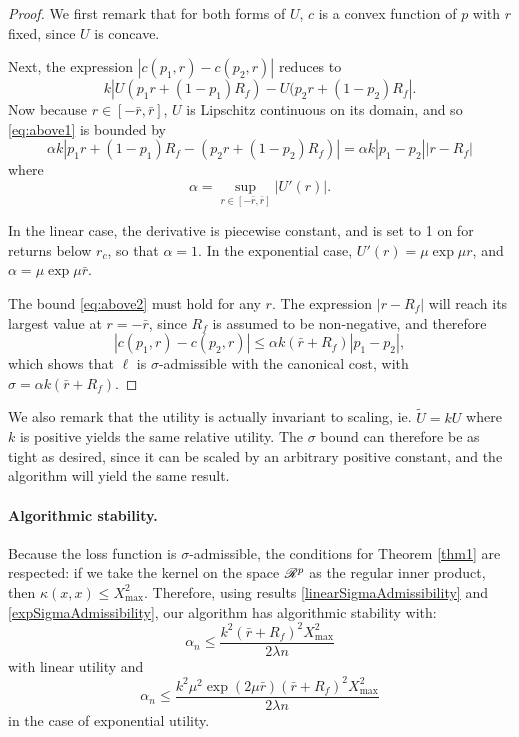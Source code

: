 \begin{proof}We first remark that for both forms of $U$, $c$ is a convex function of $p$
  with $r$ fixed, since $U$ is concave.

Next, the expression $|c(p_1,r)-c(p_2,r)|$ reduces to
\begin{equation}
  \label{eq:above1} 
  k|U(p_1r + (1-p_1)R_f) - U(p_2r + (1-p_2)R_f|.
\end{equation} Now because $r\in[-\bar r,\bar r]$, $U$ is Lipschitz continuous on its
domain, and so \eqref{eq:above1} is bounded by
\begin{equation}
  \label{eq:above2} 
  \alpha k|p_1r + (1-p_1)R_f - (p_2r + (1-p_2)R_f)| = \alpha k|p_1-p_2||r-R_f|
\end{equation} 
where
\begin{equation*} 
  \alpha = \sup_{r\in[-\bar r,\bar r]} |U'(r)|.
\end{equation*}

In the linear case, the derivative is piecewise constant, and is set to 1 on for returns
below $r_c$, so that $\alpha=1$. In the exponential case, $U'(r) = \mu\exp\mu r$, and $\alpha
= \mu\exp \mu \bar r$.

The bound \eqref{eq:above2} must hold for any $r$. The expression $|r-R_f|$ will reach
its largest value at $r=-\bar r$, since $R_f$ is assumed to be non-negative, and therefore
\begin{equation*} 
  |c(p_1,r) - c(p_2,r)| \leq \alpha k(\bar r + R_f)|p_1-p_2|,
\end{equation*} 
which shows that $\ell$ is $\sigma$-admissible with the canonical cost,
with $\sigma=\alpha k(\bar r+ R_f)$.
\end{proof}

We also remark that the utility is actually invariant to scaling, ie. $\tilde{U} = kU$
where $k$ is positive yields the same relative utility. The $\sigma$ bound can therefore
be as tight as desired, since it can be scaled by an arbitrary positive constant, and the
algorithm will yield the same result.

\paragraph{Algorithmic stability.}
Because the loss function is $\sigma$-admissible, the conditions for Theorem \ref{thm1}
are respected: if we take the kernel on the space $\mathscr{R}^p$ as the regular inner product,
then $\kappa(x,x)\leq X^2_{\max}$. Therefore, using results
\eqref{linearSigmaAdmissibility} and \eqref{expSigmaAdmissibility}, our algorithm has
algorithmic stability with:
\begin{equation}
  \label{algoStabilityLinear}
  \alpha_n \leq \frac{k^2(\bar r+R_f)^2X^2_{\max}}{2\lambda n}
\end{equation}
 with linear utility and
\begin{equation*}
   \alpha_n \leq \frac{k^2 \mu^2 \exp(2\mu\bar r)(\bar r + R_f)^2 X^2_{\max}}{2\lambda n}
\end{equation*}
in the case of exponential utility.


